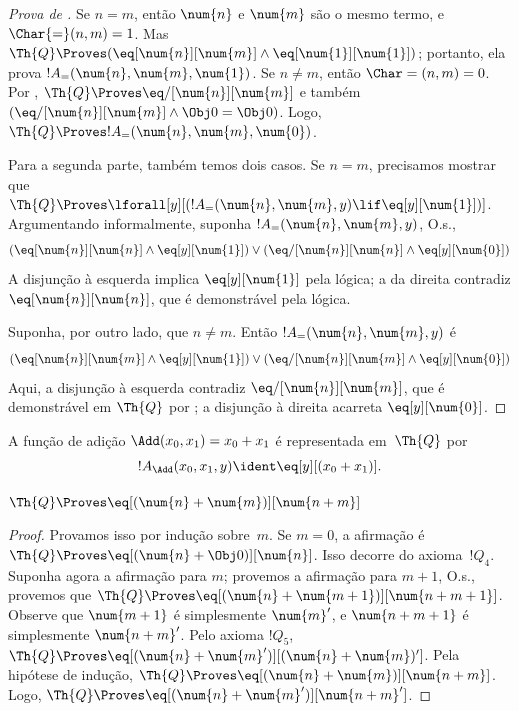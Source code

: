\documentclass[../../../include/open-logic-section]{subfiles}
\begin{document}
\begin{proof}[Prova de ]
Se $n = m$, então $\num{n}$ e $\num{m}$ são o mesmo termo, e
$\Char{=}(n, m) = 1$. Mas $\Th{Q} \Proves (\eq[\num{n}][\num{m}] \land
\eq[\num{1}][\num{1}])$; portanto, ela prova $!A_=(\num{n}, \num{m},
\num{1})$. Se $n \neq m$, então $\Char=(n, m) = 0$. Por
, $\Th{Q} \Proves \eq/[\num{n}][\num{m}]$
e também $(\eq/[\num{n}][\num{m}] \land \Obj 0 = \Obj 0)$. Logo, $\Th{Q}
\Proves !A_=(\num{n}, \num{m}, \num{0})$.

Para a segunda parte, também temos dois casos. Se $n = m$, precisamos
mostrar que $\Th{Q} \Proves \lforall[y][(!A_=(\num{n}, \num{m}, y)
  \lif \eq[y][\num{1}])]$. Argumentando informalmente, suponha
$!A_=(\num{n}, \num{m}, y)$, O.s.\@,
\[
(\eq[\num{n}][\num{n}] \land \eq[y][\num{1}]) \lor
(\eq/[\num{n}][\num{n}] \land \eq[y][\num{0}])
\]
A disjunção à esquerda implica $\eq[y][\num{1}]$ pela lógica; a da
direita contradiz $\eq[\num{n}][\num{n}]$, que é demonstrável pela
lógica.

Suponha, por outro lado, que $n \neq m$. Então $!A_=(\num{n},
\num{m}, y)$ é
\[
(\eq[\num{n}][\num{m}] \land \eq[y][\num{1}]) \lor
(\eq/[\num{n}][\num{m}] \land \eq[y][\num{0}])
\]
Aqui, a disjunção à esquerda contradiz $\eq/[\num{n}][\num{m}]$, que é
demonstrável em $\Th{Q}$ por ; a disjunção à
direita acarreta $\eq[y][\num{0}]$.
\end{proof}

\begin{prop}
A função de adição $\Add(x_0, x_1) = x_0+x_1$ é representada
em~$\Th{Q}$ por
\[
  !A_{\Add}(x_0, x_1, y) \ident \eq[y][(x_0 + x_1)].
\]
\end{prop}

\begin{lem}
$\Th{Q} \Proves \eq[(\num{n} + \num{m})][\num{n+m}]$
\end{lem}

\begin{proof}
Provamos isso por indução sobre~$m$. Se $m = 0$, a afirmação é
$\Th{Q} \Proves \eq[(\num{n} + \Obj 0)][\num{n}]$. Isso decorre do
axioma~$!Q_4$. Suponha agora a afirmação para $m$; provemos a afirmação
para $m+1$, O.s.\@, provemos que $\Th{Q} \Proves \eq[(\num{n} +
  \num{m+1})][\num{n+m+1}]$. Observe que $\num{m+1}$ é simplesmente
$\num{m}'$, e $\num{n+m+1}$ é simplesmente $\num{n+m}'$. Pelo axioma
$!Q_5$, $\Th{Q} \Proves
\eq[(\num{n} + \num{m}')][(\num{n}+\num{m})']$. Pela hipótese de
indução, $\Th{Q} \Proves
\eq[(\num{n} + \num{m})][\num{n+m}]$. Logo, $\Th{Q} \Proves
\eq[(\num{n} + \num{m}')][\num{n+m}']$.
\end{proof}
\end{document}
